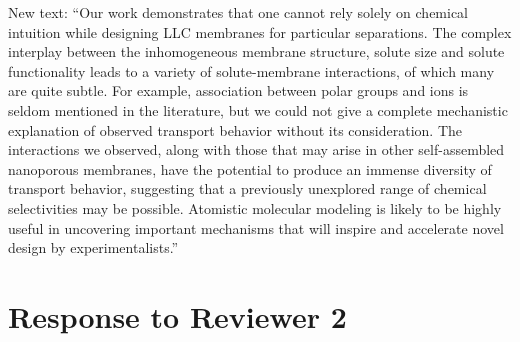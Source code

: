\documentclass{article}
\begin{document}
\begin{enumerate}
    New text: ``Our work demonstrates that one cannot rely solely on chemical intuition while 
    designing LLC membranes for particular separations. 
    The complex interplay between the
    inhomogeneous membrane structure, solute size and solute functionality leads to a variety of
    solute-membrane interactions, of which many are quite subtle. For example, association
    between polar groups and ions is seldom mentioned in the literature, but we could not give a
    complete mechanistic explanation of observed transport behavior without its consideration. 
    The interactions we observed, along with those that may arise in 
    other
    self-assembled
    nanoporous membranes, 
    have the potential to produce an immense 
    diversity of transport behavior, 
    suggesting
    that a 
    previously unexplored range
    of chemical selectivities may be possible. Atomistic molecular modeling
    is likely to be highly useful in
    uncovering 
    important 
    mechanisms that will inspire and accelerate
    novel design by experimentalists.''
	
\end{enumerate}

\section*{Response to Reviewer 2}
\end{document}
